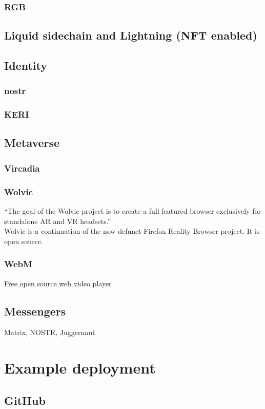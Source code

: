 \subsection{RGB}
\lipsum[50]
\section{Liquid sidechain and Lightning (NFT enabled)}
\lipsum[50]





\lipsum[50]
\section{Identity}
\subsection{nostr}
\lipsum[50]
\subsection{KERI}
\lipsum[50]
\section{Metaverse}
\lipsum[50]
\subsection{Vircadia}
\lipsum[50]
\subsection{Wolvic}
``The goal of the Wolvic project is to create a full-featured browser exclusively for standalone AR and VR headsets.''\\
Wolvic is a continuation of the now defunct Firefox Reality Browser project. It is open source.
\subsection{WebM}
\href{https://www.webmproject.org/about/}{Free open source web video player}	
\lipsum[50]
\section{Messengers}
Matrix, NOSTR, Juggernaut
\chapter{Example deployment }
\lipsum[50]
\section{GitHub }
\lipsum[50]